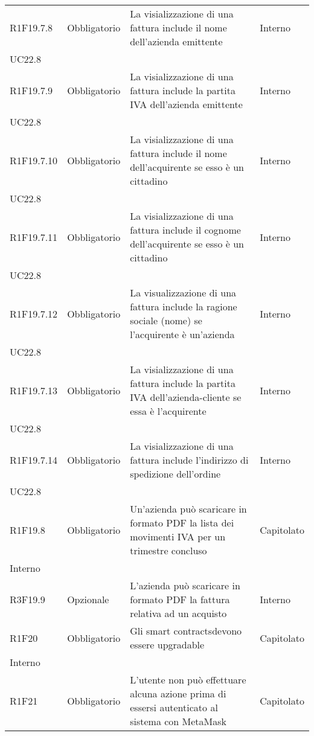 \begin{longtable}{ >{\centering}p{} >{\centering}p{}
		>{\raggedright}p{} >{\centering}p{}}
	R1F19.7.8	&	Obbligatorio	&	La visializzazione di una fattura include il nome dell'azienda emittente	&	Interno\\ UC22.8	\tabularnewline
	R1F19.7.9	&	Obbligatorio	&	La visializzazione di una fattura include la partita IVA dell'azienda emittente	&	Interno\\ UC22.8	\tabularnewline
	R1F19.7.10	&	Obbligatorio	&	La visializzazione di una fattura include il nome dell'acquirente se esso è un cittadino	&	Interno\\ UC22.8	\tabularnewline
	R1F19.7.11	&	Obbligatorio	&	La visializzazione di una fattura include il cognome dell'acquirente se esso è un cittadino	&	Interno\\ UC22.8	\tabularnewline
	R1F19.7.12	&	Obbligatorio	&	La visualizzazione di una fattura include la ragione sociale (nome) se l'acquirente è un'azienda 	&	Interno\\ UC22.8	\tabularnewline
	R1F19.7.13	&	Obbligatorio	&	La visializzazione di una fattura include la partita IVA dell'azienda-cliente se essa è l'acquirente	&	Interno\\ UC22.8	\tabularnewline
	R1F19.7.14	&	Obbligatorio	&	La visializzazione di una fattura include l'indirizzo di spedizione dell'ordine	&	Interno\\ UC22.8	\tabularnewline
	R1F19.8	&	Obbligatorio	&	Un'azienda può scaricare in formato PDF la lista dei movimenti IVA per un trimestre concluso	&	Capitolato\\ Interno	\tabularnewline
	R3F19.9	&	Opzionale	&	L'azienda può scaricare in formato PDF la fattura relativa ad un acquisto	&	Interno	\tabularnewline
	R1F20	&	Obbligatorio	&	Gli smart contracts\glosp devono essere upgradable	&	Capitolato\\ Interno	\tabularnewline
	R1F21	&	Obbligatorio	&	L'utente non può effettuare alcuna azione prima di essersi autenticato al sistema con MetaMask\glo	&	Capitolato	\tabularnewline
	
	
	
\end{longtable}

